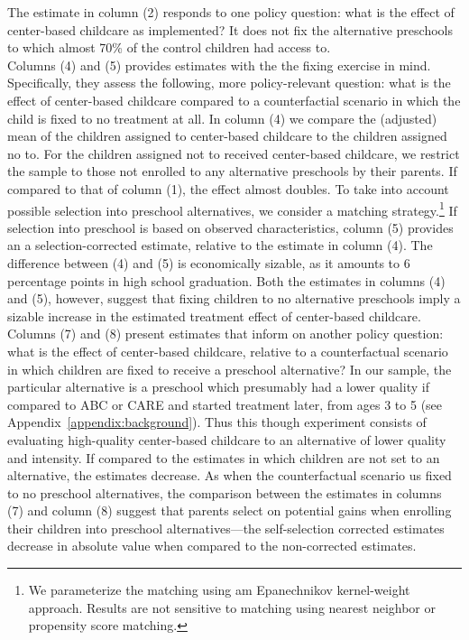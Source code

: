\noindent The estimate in column (2) responds to one policy question: what is the effect of center-based childcare as implemented? It does not fix the alternative preschools to which almost 70\% of the control children had access to.\\

\noindent Columns (4) and (5) provides estimates with the the fixing exercise in mind. Specifically, they assess the following, more policy-relevant question: what is the effect of center-based childcare compared to a counterfactial scenario in which the child is fixed to no treatment at all. In column (4) we compare the (adjusted) mean of the children assigned to center-based childcare to the children assigned no to. For the children assigned not to received center-based childcare, we restrict the sample to those not enrolled to any alternative preschools by their parents. If compared to that of column (1), the effect almost doubles. To take into account possible selection into preschool alternatives, we consider a matching strategy.\footnote{We parameterize the matching using am Epanechnikov kernel-weight approach. Results are not sensitive to matching using nearest neighbor or propensity score matching.} If selection into preschool is based on observed characteristics, column (5) provides an a selection-corrected estimate, relative to the estimate in column (4). The difference between (4) and (5) is economically sizable, as it amounts to 6 percentage points in high school graduation. Both the estimates in columns (4) and (5), however, suggest that fixing children to no alternative preschools imply a sizable increase in the estimated treatment effect of center-based childcare.\\

\noindent Columns (7) and (8) present estimates that inform on another policy question: what is the effect of center-based childcare, relative to a counterfactual scenario in which children are fixed to receive a preschool alternative? In our sample, the particular alternative is a preschool which presumably had a lower quality if compared to ABC or CARE and started treatment later, from ages 3 to 5 (see Appendix~\ref{appendix:background}). Thus this though experiment consists of evaluating high-quality center-based childcare to an alternative of lower quality and intensity. If compared to the estimates in which children are not set to an alternative, the estimates decrease. As when the counterfactual scenario us fixed to no preschool alternatives, the comparison between the estimates in columns (7) and column (8) suggest that parents select on potential gains when enrolling their children into preschool alternatives---the self-selection corrected estimates decrease in absolute value when compared to the non-corrected estimates.\\

